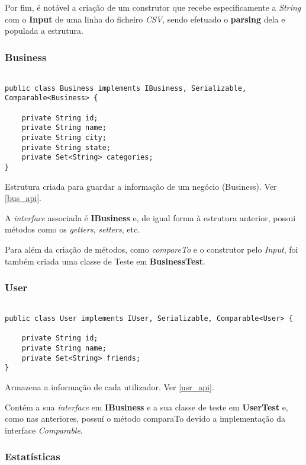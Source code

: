 \documentclass[11pt]{article}
\begin{document}
Por fim, é notável a criação de um construtor que recebe especificamente a \textit{String} com o \textbf{Input} de uma linha do ficheiro \textit{CSV}, sendo efetuado o \textbf{parsing} dela e populada a estrutura.

\subsubsection{Business}

\begin{verbatim}
	
public class Business implements IBusiness, Serializable, Comparable<Business> {

	private String id;
	private String name;
	private String city;
	private String state;
	private Set<String> categories;
}
\end{verbatim}

Estrutura criada para guardar a informação de um negócio (Business). Ver \ref{bus_api}.

A \textit{interface} associada é \textbf{IBusiness} e, de igual forma à estrutura anterior, possui métodos como os \textit{getters}, \textit{setters}, etc.

Para além da criação de métodos, como \textit{compareTo} e o construtor pelo \textit{Input}, foi também criada uma classe de Teste em \textbf{BusinessTest}.

\subsubsection{User}

\begin{verbatim}

public class User implements IUser, Serializable, Comparable<User> {

	private String id;
	private String name;
	private Set<String> friends;
}	
\end{verbatim}

Armazena a informação de cada utilizador. Ver \ref{usr_api}.

Contém a sua \textit{interface} em \textbf{IBusiness} e a sua classe de teste em \textbf{UserTest} e, como nas anteriores, possuí o método comparaTo devido a implementação da interface \textit{Comparable}.

\subsubsection{Estatísticas}
\end{document}
